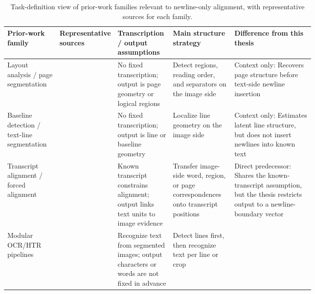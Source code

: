 \begin{table}[t]
    \centering
    \scriptsize
    \setlength{\tabcolsep}{2.5pt}
    \renewcommand{\arraystretch}{1.08}
    \caption{Task-definition view of prior-work families relevant to newline-only alignment, with representative sources for each family.}
    \label{tab:sota_task_definitions}
    \begin{tabularx}{\linewidth}{@{}>{\raggedright\arraybackslash}p{0.17\linewidth}>{\raggedright\arraybackslash}p{0.18\linewidth}>{\raggedright\arraybackslash}p{0.18\linewidth}>{\raggedright\arraybackslash}p{0.20\linewidth}Y@{}}
        \toprule
        Prior-work family & Representative sources & Transcription / output assumptions & Main structure strategy & Difference from this thesis \\
        \midrule
        Layout analysis / page segmentation &
         &
        No fixed transcription; output is page geometry or logical regions &
        Detect regions, reading order, and separators on the image side &
        Context only: Recovers page structure before text-side newline insertion \\
        \addlinespace[0.2em]
        Baseline detection / text-line segmentation &
         &
        No fixed transcription; output is line or baseline geometry &
        Localize line geometry on the image side &
        Context only: Estimates latent line structure, but does not insert newlines into known text \\
        \addlinespace[0.2em]
        Transcript alignment / forced alignment &
         &
        Known transcript constrains alignment; output links text units to image evidence &
        Transfer image-side word, region, or page correspondences onto transcript positions &
        Direct predecessor: Shares the known-transcript assumption, but the thesis restricts output to a newline-boundary vector \\
        \addlinespace[0.2em]
        Modular OCR/HTR pipelines &
         &
        Recognize text from segmented images; output characters or words are not fixed in advance &
        Detect lines first, then recognize text per line or crop &

\end{tabularx}
\end{table}

